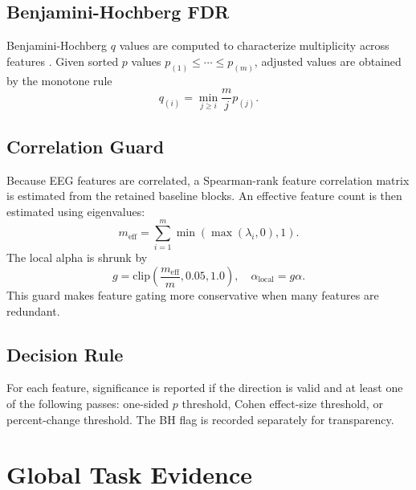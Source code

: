 \documentclass[conference]{IEEEtran}
\begin{document}
\subsection{Benjamini-Hochberg FDR}
Benjamini-Hochberg $q$ values are computed to characterize multiplicity across features \cite{benjamini1995}. Given sorted $p$ values $p_{(1)}\le\cdots\le p_{(m)}$, adjusted values are obtained by the monotone rule
\begin{equation}
q_{(i)}=\min_{j\ge i}\frac{m}{j}p_{(j)}.
\end{equation}

\subsection{Correlation Guard}
Because EEG features are correlated, a Spearman-rank feature correlation matrix is estimated from the retained baseline blocks. An effective feature count is then estimated using eigenvalues:
\begin{equation}
m_{\mathrm{eff}}=\sum_{i=1}^{m}\min(\max(\lambda_i,0),1).
\end{equation}
The local alpha is shrunk by
\begin{equation}
g=\mathrm{clip}\left(\frac{m_{\mathrm{eff}}}{m},0.05,1.0\right),
\quad
\alpha_{\mathrm{local}}=g\alpha .
\end{equation}
This guard makes feature gating more conservative when many features are redundant.

\subsection{Decision Rule}
For each feature, significance is reported if the direction is valid and at least one of the following passes: one-sided $p$ threshold, Cohen effect-size threshold, or percent-change threshold. The BH flag is recorded separately for transparency.

\section{Global Task Evidence}
\end{document}
